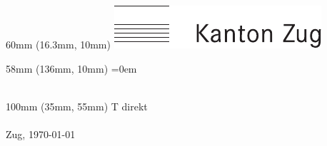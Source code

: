 

\thispagestyle{myheadings}

\iflogo%
\begin{textblock}{60mm\TPHorizModule} (16.3mm\TPHorizModule,
  10mm\TPVertModule)
  \includegraphics{logo_sw}
\end{textblock}
\fi

\iforganisation%
\begin{textblock}{58mm\TPHorizModule} (136mm\TPHorizModule,
  10mm\TPVertModule)
  \parskip=0em%
  \fontsize{8}{9}\selectfont
  \CreatorDirektion\\
  \CreatorAmt\\
  \CreatorDienststelle%
\end{textblock}
\fi

\begin{textblock}{100mm\TPHorizModule} (35mm\TPHorizModule,
  55mm\TPVertModule)
  \vspace{-\parskip}%
  \fontsize{8}{9} \selectfont
  \ifcontact%
  T direkt \CreatorPhone\\
  \CreatorEmail\\
  \fi
  Zug, \today\\
\end{textblock}
\phantom{foo}\vspace{-2\baselineskip}
\vspace{22mm}
